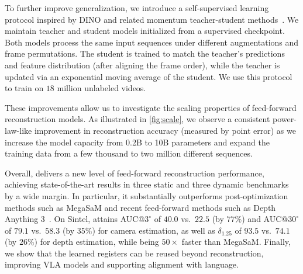 To further improve generalization, we introduce a self-supervised learning protocol inspired by DINO and related momentum teacher-student methods~\cite{caron21emerging, oquab24dinov2:,simeoni25dinov3, tarvainen17mean, he20momentum}.
We maintain teacher and student models initialized from a supervised \method checkpoint.
Both models process the same input sequences under different augmentations and frame permutations.
The student is trained to match the teacher's predictions and feature distribution (after aligning the frame order), while the teacher is updated via an exponential moving average of the student.
We use this protocol to train on $18$ million unlabeled videos.

These improvements allow us to investigate the scaling properties of feed-forward reconstruction models.
As illustrated in \cref{fig:scale}, we observe a consistent power-law-like improvement in reconstruction accuracy (measured by point error) as we increase the model capacity from 0.2B to 10B parameters and expand the training data from a few thousand to two million different sequences.

Overall, \method delivers a new level of feed-forward reconstruction performance, achieving state-of-the-art results in three static and three dynamic benchmarks by a wide margin.
In particular, it substantially outperforms post-optimization methods such as MegaSaM and recent feed-forward methods such as Depth Anything 3~\cite{lin25depth}.
On Sintel, \method attains AUC@$3^\circ$ of $40.0$ vs.\ $22.5$ (by $77\%$) and AUC@$30^\circ$ of $79.1$ vs.\ $58.3$ (by $35\%$) for camera estimation, as well as $\delta_{1.25}$ of $93.5$ vs.\ $74.1$ (by $26\%$) for depth estimation, while being $50\times$ faster than MegaSaM\@.
Finally, we show that the learned registers can be reused beyond reconstruction, improving VLA models and supporting alignment with language.


